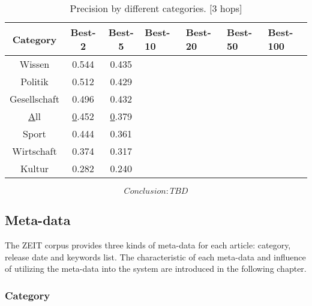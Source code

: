 \begin{table}[!htbp]
\centering
\begin{tabular}{|c|c|c|l|l|l|l|}
\hline
\textbf{Category} & \textbf{Best-2} & \textbf{Best-5} & \textbf{Best-10} & \textbf{Best-20} & \textbf{Best-50} & \textbf{Best-100} \\ \hline
Wissen            & 0.544           & 0.435           &                  &                  &                  &                   \\ \hline
Politik           & 0.512           & 0.429           &                  &                  &                  &                   \\ \hline
Gesellschaft      & 0.496           & 0.432           &                  &                  &                  &                   \\ \hline
{\ul All}         & {\ul 0.452}     & {\ul 0.379}     & {\ul }           & {\ul }           & {\ul }           & {\ul }            \\ \hline
Sport             & 0.444           & 0.361           &                  &                  &                  &                   \\ \hline
Wirtschaft        & 0.374           & 0.317           &                  &                  &                  &                   \\ \hline
Kultur            & 0.282           & 0.240           &                  &                  &                  &                   \\ \hline
\end{tabular}
\caption{Precision by different categories. [3 hops]}
\label{precision_category}
\end{table}

\[Conclusion: TBD\] 

\subsection{Meta-data}

The ZEIT corpus provides three kinds of meta-data for each article: category, release date and keywords list. The characteristic of each meta-data and influence of utilizing the meta-data into the system are introduced in the following chapter.

\subsubsection{Category}

